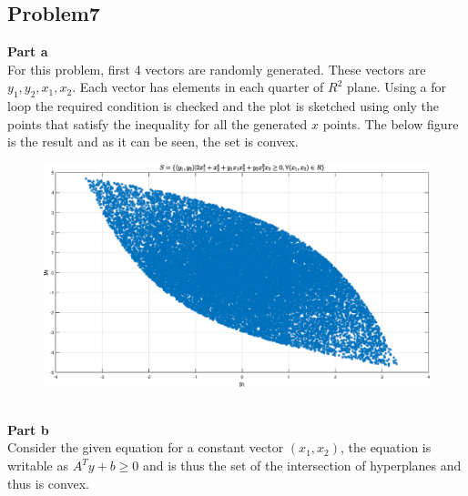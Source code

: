 \documentclass[a4paper]{article}
\begin{document}
\begin{Large}
	\subsection*{Problem7}
		\textbf{Part a}\\
		For this problem, first 4 vectors are randomly generated. These vectors are $ y_1, y_2, x_1, x_2 $. Each vector has elements in each quarter of $ R^2 $ plane. Using a for loop the required condition is checked and the plot is sketched using only the points that satisfy the inequality for all the generated $ x $ points. The below figure is the result and as it can be seen, the set is convex.
	\begin{figure}[!h]
		\begin{center}
			\includegraphics[scale=.45]{q7}
		\end{center}
	\end{figure}
\\\textbf{Part b}\\
Consider the given equation for a constant vector $ (x_1, x_2) $, the equation is writable as $ A^Ty+b\geq 0 $ and is thus the set of the intersection of hyperplanes and thus is convex.
	
	\newpage

\end{Large}
\end{document}
